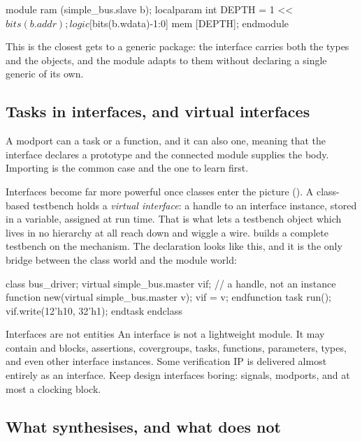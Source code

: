 \begin{svcode}
module ram (simple_bus.slave b);
  localparam int DEPTH = 1 << $bits(b.addr);
  logic [$bits(b.wdata)-1:0] mem [DEPTH];
endmodule
\end{svcode}

This is the closest \SV{} gets to a \VHDL{} generic package: the interface
carries both the types and the objects, and the module adapts to them without
declaring a single generic of its own.

\subsection{Tasks in interfaces, and virtual interfaces}

A modport can  a task or a function, and it can also 
one, meaning that the interface declares a prototype and the connected module
supplies the body. Importing is the common case and the one to learn first.

Interfaces become far more powerful once classes enter the picture
(). A class-based testbench holds a \emph{virtual
interface}: a handle to an interface instance, stored
in a variable, assigned at run time. That is what lets a testbench object
which lives in no hierarchy at all reach down and wiggle a wire.
 builds a complete testbench on the mechanism. The declaration
looks like this, and it is the only bridge between the class world and the
module world:

\begin{svcode}
class bus_driver;
  virtual simple_bus.master vif;   // a handle, not an instance
  function new(virtual simple_bus.master v); vif = v; endfunction
  task run(); vif.write(12'h10, 32'h1); endtask
endclass
\end{svcode}

\begin{notebox}{Interfaces are not entities}
An interface is not a lightweight module. It may contain  and
 blocks, assertions, covergroups, tasks, functions, parameters,
types, and even other interface instances. Some verification IP is delivered
almost entirely as an interface. Keep design interfaces boring: signals,
modports, and at most a clocking block.
\end{notebox}

\subsection{What synthesises, and what does not}

